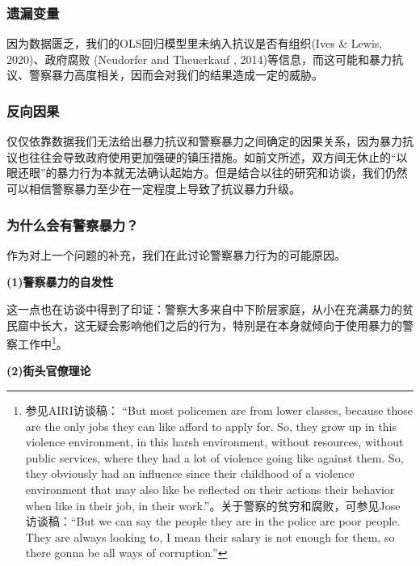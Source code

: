 \documentclass{phyasgn}\usepackage{nag}
\begin{document}
\subsubsection{遗漏变量}
因为数据匮乏，我们的OLS回归模型里未纳入抗议是否有组织(Ives \& Lewis, 2020)、政府腐败 (Neudorfer and Theuerkauf , 2014)等信息，而这可能和暴力抗议、警察暴力高度相关，因而会对我们的结果造成一定的威胁。
\subsubsection{反向因果}
仅仅依靠数据我们无法给出暴力抗议和警察暴力之间确定的因果关系，因为暴力抗议也往往会导致政府使用更加强硬的镇压措施。如前文所述，双方间无休止的“以眼还眼”的暴力行为本就无法确认起始方。但是结合以往的研究和访谈，我们仍然可以相信警察暴力至少在一定程度上导致了抗议暴力升级。
\subsubsection{为什么会有警察暴力？}
作为对上一个问题的补充，我们在此讨论警察暴力行为的可能原因。
\par \textbf{(1)警察暴力的自发性}
\par 这一点也在访谈中得到了印证：警察大多来自中下阶层家庭，从小在充满暴力的贫民窟中长大，这无疑会影响他们之后的行为，特别是在本身就倾向于使用暴力的警察工作中\footnote[80]{参见AIRI访谈稿： “But most policemen are from lower classes, because those are the only jobs they can like afford to apply for. So, they grow up in this violence environment, in this harsh environment, without resources, without public services, where they had a lot of violence going like against them. So, they obviously had an influence since their childhood of a violence environment that may also like be reflected on their actions their behavior when like in their job, in their work.”。关于警察的贫穷和腐败，可参见Jose 访谈稿：“But we can say the people they are in the police are poor people. They are always looking to, I mean their salary is not enough for them, so there gonna be all ways of corruption.”}。
\par \textbf{(2)街头官僚理论}
\end{document}
